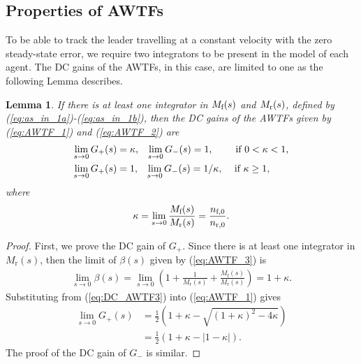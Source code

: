 \documentclass[10pt,twocolumn,twoside]{IEEEtran}
\newtheorem{lemma}{Lemma}
\theoremstyle{definition}
\begin{document}
\subsection{Properties of AWTFs}

To be able to track the leader travelling at a constant velocity with the zero steady-state error, we require two integrators to be present in the model of each agent. The DC gains of the AWTFs, in this case, are limited to one as the following Lemma describes.
\begin{lemma}\label{lemma:DC_gains}
  If there is at least one integrator in $M_{\textnormal{f}}(s)$ and $M_{\textnormal{r}}(s)$, defined by (\ref{eq:as_in_1a})-(\ref{eq:as_in_1b}), then the DC gains of the AWTFs given by (\ref{eq:AWTF_1}) and (\ref{eq:AWTF_2}) are
  \begin{align}
    \lim_{s \rightarrow 0} G_+(s) &= \kappa, \;\;\; \lim_{s \rightarrow 0} G_-(s) = 1, \;\;\;\;\;\;\; \textnormal{ if } 0< \kappa < 1,\label{eq:DC_AWTF1a}\\
     \lim_{s \rightarrow 0} G_+(s) &= 1, \;\;\; \lim_{s \rightarrow 0} G_-(s) = 1/\kappa, \;\;\; \textnormal{ if } \kappa \geq 1,\label{eq:DC_AWTF1b}
  \end{align}
  where
  \begin{align}
  \kappa = \lim_{s\rightarrow 0} \frac{M_{\textnormal{f}}(s)}{M_{\textnormal{r}}(s)} = \frac{n_{\textnormal{f},0}}{n_{\textnormal{r},0}}.
  \end{align}
\end{lemma}
\begin{proof}
  First, we prove the DC gain of $G_+$. Since there is at least one integrator in $M_{\text{r}}(s)$, then the limit of $\beta(s)$ given by (\ref{eq:AWTF_3}) is
  \begin{align}
    \lim_{s \rightarrow 0}\beta(s) = \lim_{s \rightarrow 0} \left(1+\frac{1}{M_{\text{r}}(s)}+\frac{M_{\text{f}}(s)}{M_{\text{r}}(s)}\right) = 1+\kappa.\label{eq:DC_AWTF3}
  \end{align}
  Substituting from (\ref{eq:DC_AWTF3}) into (\ref{eq:AWTF_1}) gives
  \begin{align}
  \lim_{s \rightarrow 0} G_+(s) &= \frac{1}{2}\left(1+\kappa-\sqrt{(1+\kappa)^2-4\kappa}\right)\nonumber\\
  &= \frac{1}{2}(1+\kappa -|1-\kappa|).\label{eq:lim_Gplus}
  \end{align}
  The proof of the DC gain of $G_-$ is similar.
\end{proof}
\end{document}

